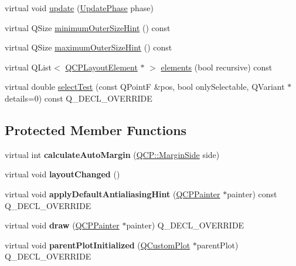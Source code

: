 \begin{DoxyCompactItemize}
\item 
virtual void \hyperlink{classQCPLayoutElement_a929c2ec62e0e0e1d8418eaa802e2af9b}{update} (\hyperlink{classQCPLayoutElement_a0d83360e05735735aaf6d7983c56374d}{Update\+Phase} phase)
\item 
virtual Q\+Size \hyperlink{classQCPLayoutElement_a4c540ba5c686a1494c92c466912e5411}{minimum\+Outer\+Size\+Hint} () const 
\item 
virtual Q\+Size \hyperlink{classQCPLayoutElement_ad60d20664d3950e93c3584e0e7b761bd}{maximum\+Outer\+Size\+Hint} () const 
\item 
virtual Q\+List$<$ \hyperlink{classQCPLayoutElement}{Q\+C\+P\+Layout\+Element} $\ast$ $>$ \hyperlink{classQCPLayoutElement_a311d60d78e62ef8eaaedb1b6ceb9e788}{elements} (bool recursive) const 
\item 
virtual double \hyperlink{classQCPLayoutElement_ae97f483cccedadbf18ea4525ef240ee4}{select\+Test} (const Q\+PointF \&pos, bool only\+Selectable, Q\+Variant $\ast$details=0) const Q\+\_\+\+D\+E\+C\+L\+\_\+\+O\+V\+E\+R\+R\+I\+DE
\end{DoxyCompactItemize}
\subsection*{Protected Member Functions}
\begin{DoxyCompactItemize}
\item 
virtual int {\bfseries calculate\+Auto\+Margin} (\hyperlink{namespaceQCP_a7e487e3e2ccb62ab7771065bab7cae54}{Q\+C\+P\+::\+Margin\+Side} side)\hypertarget{classQCPLayoutElement_a005c9f0fe84bc1591a2cf2c46fd477b4}{}\label{classQCPLayoutElement_a005c9f0fe84bc1591a2cf2c46fd477b4}

\item 
virtual void {\bfseries layout\+Changed} ()\hypertarget{classQCPLayoutElement_a765f041a73af0c2de41b41a5a03e31a4}{}\label{classQCPLayoutElement_a765f041a73af0c2de41b41a5a03e31a4}

\item 
virtual void {\bfseries apply\+Default\+Antialiasing\+Hint} (\hyperlink{classQCPPainter}{Q\+C\+P\+Painter} $\ast$painter) const Q\+\_\+\+D\+E\+C\+L\+\_\+\+O\+V\+E\+R\+R\+I\+DE\hypertarget{classQCPLayoutElement_a0a8f18141bcf46cf40ad4c13324ff346}{}\label{classQCPLayoutElement_a0a8f18141bcf46cf40ad4c13324ff346}

\item 
virtual void {\bfseries draw} (\hyperlink{classQCPPainter}{Q\+C\+P\+Painter} $\ast$painter) Q\+\_\+\+D\+E\+C\+L\+\_\+\+O\+V\+E\+R\+R\+I\+DE\hypertarget{classQCPLayoutElement_ad1c597b1d608cfdd86e7b76819a94cfb}{}\label{classQCPLayoutElement_ad1c597b1d608cfdd86e7b76819a94cfb}

\item 
virtual void {\bfseries parent\+Plot\+Initialized} (\hyperlink{classQCustomPlot}{Q\+Custom\+Plot} $\ast$parent\+Plot) Q\+\_\+\+D\+E\+C\+L\+\_\+\+O\+V\+E\+R\+R\+I\+DE\hypertarget{classQCPLayoutElement_ab4bb5c5a958451f5f153fdce350f13cf}{}\label{classQCPLayoutElement_ab4bb5c5a958451f5f153fdce350f13cf}

\end{DoxyCompactItemize}
